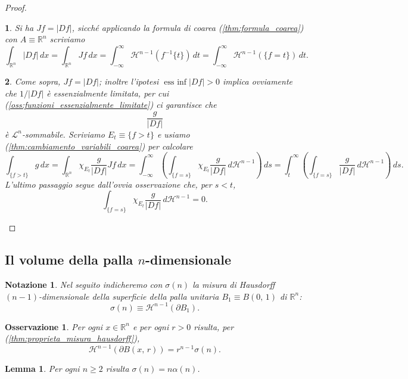 \documentclass[a4paper,10pt,openright,oneside]{book}
\theoremstyle{theoremstyle}
\newtheorem{lemma}[teorema]{Lemma}
\theoremstyle{theoremstylewoheader}
\theoremstyle{theoremstyle}
\newtheorem{notazione}[teorema]{Notazione}
\newtheorem{osservazione}[teorema]{Osservazione}
\theoremstyle{proofsecstyle}
\newtheorem{proofsec}{}
\theoremstyle{nonumberplain}
\newtheorem{proof}{Dim.}
\newcommand{\RR}{\ensuremath{\mathbb{R}}}
\newcommand{\Leb}{\ensuremath{\mathcal{L}}}
\newcommand{\Haus}{\ensuremath{\mathcal{H}}}
\newcommand{\abs}[1]{\ensuremath{\lvert #1 \rvert}}
\newcommand{\boundary}[1]{\ensuremath{\partial #1}}
\DeclareMathOperator{\essinf}{ess\:inf}
\begin{document}
\begin{proof}
\begin{proofsec}
Si ha $Jf = \abs{Df}$, sicché applicando la formula di coarea (\ref{thm:formula_coarea}) con $A \equiv \RR^n$ scriviamo
\[
\int_{\RR^n} \abs{Df}\, dx = \int_{\RR^n} Jf\, dx = \int_{-\infty}^\infty \Haus^{n-1}(f^{-1}\{t\})\, dt = \int_{-\infty}^\infty \Haus^{n-1}(\{f = t\})\, dt.
\]
\end{proofsec}

\begin{proofsec}
Come sopra, $Jf = \abs{Df}$; inoltre l'ipotesi $\essinf \abs{Df} > 0$ implica ovviamente che $1/\abs{Df}$ è essenzialmente limitata, per cui (\ref{oss:funzioni_essenzialmente_limitate}) ci garantisce che
\[
\frac{g}{\abs{Df}}
\]
è $\Leb^n$-sommabile. Scriviamo $E_t \equiv \{f > t\}$ e usiamo (\ref{thm:cambiamento_variabili_coarea}) per calcolare
\[
\int_{\{f > t\}} g\, dx = \int_{\RR^n} \chi_{E_t} \frac{g}{\abs{Df}} Jf\, dx
= \int_{-\infty}^\infty \left(\int_{\{f = s\}} \chi_{E_t} \frac{g}{\abs{Df}}\, d\Haus^{n-1}\right)\, ds = \int_t^\infty \left(\int_{\{f = s\}} \frac{g}{\abs{Df}}\, d\Haus^{n-1}\right)\, ds.
\]
L'ultimo passaggio segue dall'ovvia osservazione che, per $s < t$,
\[
\int_{\{f = s\}} \chi_{E_t} \frac{g}{\abs{Df}}\, d\Haus^{n-1} = 0.
\]
\end{proofsec}
\end{proof}

\subsection{Il volume della palla $n$-dimensionale}

\begin{notazione}
Nel seguito indicheremo con $\sigma(n)$ la misura di Hausdorff $(n-1)$-dimensionale della superficie della palla unitaria $B_1 \equiv B(0,\, 1)$ di $\RR^n$:
\[
\sigma(n) \equiv \Haus^{n-1}(\boundary{B_1}).
\]
\end{notazione}

\begin{osservazione}
Per ogni $x \in \RR^n$ e per ogni $r > 0$ risulta, per (\ref{thm:proprieta_misura_hausdorff}),
\[
\Haus^{n-1}(\boundary{B(x,\, r)}) = r^{n-1}\sigma(n).
\]
\end{osservazione}

\begin{lemma}
\label{lem:misura_superficie_palla}
Per ogni $n \ge 2$ risulta $\sigma(n) = n\alpha(n)$.
\end{lemma}
\end{document}
